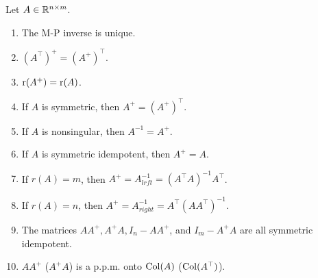 \documentclass[10pt,a4paper]{book}
\begin{document}
\begin{thmbox}
	\begin{theorem}\label{thm:prop_MP_inv}
		Let $A\in\mathbb R^{n\times m}$. 
		\begin{enumerate}
			\item The M-P inverse is unique.
			\item $(A^{\top})^{+}=(A^{+})^{\top}$.
			\item $\mathrm{r}(A^{+})=\mathrm{r}(A)$.
			\item If $A$ is symmetric, then $A^{+}=(A^{+})^{\top}$.
			\item If $A$ is nonsingular, then $A^{-1}=A^{+}$.
			\item If $A$ is symmetric idempotent, then $A^{+}=A$.
			\item If $r(A)=m$, then $A^{+}=A_{lrft}^{-1}=(A^{\top}A)^{-1}A^{\top}$.
			\item If $r(A)=n$, then $A^{+}=A_{right}^{-1}=A^{\top}(AA^{\top})^{-1}$.
			\item The matrices $AA^{+},A^{+}A,I_n-AA^{+}$, and $I_m-A^{+}A$ are all symmetric idempotent.
			\item $AA^+$ ($A^+ A$) is a p.p.m. onto $\mathrm{Col}(A)$ ($\mathrm{Col}(A^\top)$).  
		\end{enumerate}
	\end{theorem}
\end{thmbox}
\end{document}
